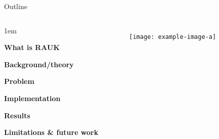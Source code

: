 \begin{frame}{Outline}
    \begin{columns}
        \begin{itemize-size}{1em} 
            \item \textbf{What is RAUK}
            \item \textbf{Background/theory}
            \item \textbf{Problem}
            \item \textbf{Implementation}
            \item \textbf{Results}
            \item \textbf{Limitations \& future work}
        \end{itemize-size}
        
        \begin{figure}
            \centering
            \texttt{[image: example-image-a]}
            \label{fig:handshake_agenda}
        \end{figure}
    \end{columns}
\end{frame}

